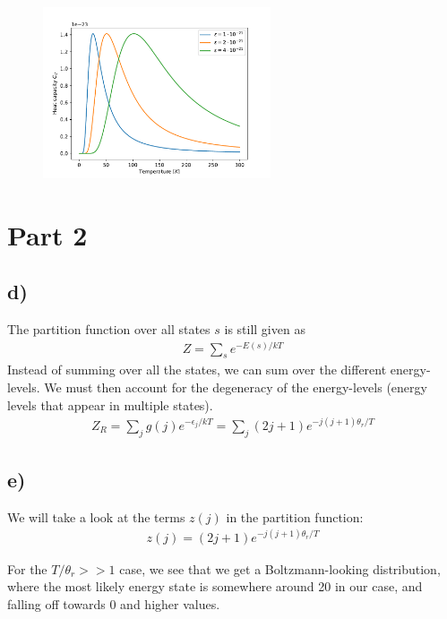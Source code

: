 \documentclass[12p,a4paper]{article}
\renewcommand{\exp}{e^}
\begin{document}
\begin{figure}[H]
    \centering
    \includegraphics[width=0.6\textwidth]{taskc.pdf}
    \caption{}
    \label{fig:C_V}
\end{figure}




\section*{Part 2}
\subsection*{d)}
The partition function over all states $s$ is still given as
\begin{align*}
    Z = \sum\limits_s \exp{-E(s)/kT}
\end{align*}
Instead of summing over all the states, we can sum over the different energy-levels. We must then account for the degeneracy of the energy-levels (energy levels that appear in multiple states).
\begin{align}\label{eqn:Z_R}
    Z_R = \sum\limits_j g(j) \exp{-\epsilon_j/kT} = \sum\limits_j (2j + 1)  \exp{-j(j+1)\theta_r/T}
\end{align}



\subsection*{e)}
We will take a look at the terms $z(j)$ in the partition function:
\begin{align*}
    z(j) = (2j + 1)  \exp{-j(j+1)\theta_r/T}
\end{align*}

For the $T/\theta_r >> 1$ case, we see that we get a Boltzmann-looking distribution, where the most likely energy state is somewhere around 20 in our case, and falling off towards 0 and higher values.
\end{document}

